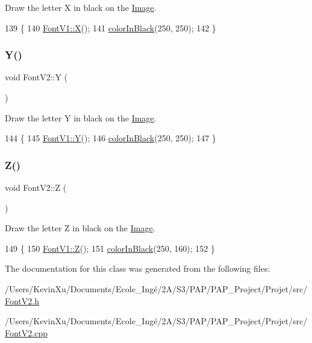Draw the letter X in black on the \mbox{\hyperlink{class_image}{Image}}. 


\begin{DoxyCode}
139                \{
140     \mbox{\hyperlink{class_font_v1_a8a93144edcf0f9bf1ac9017eb916ff82}{FontV1::X}}();
141     \mbox{\hyperlink{class_font_v2_a04f2501961bc286ce70fbb6a840b0e8a}{colorInBlack}}(250, 250);
142 \}
\end{DoxyCode}
\mbox{\label{class_font_v2_a858b25a33231fe1a78539d040e59f0ee}} 
\subsubsection{\texorpdfstring{Y()}{Y()}}
{\footnotesize\ttfamily void Font\+V2\+::Y (\begin{DoxyParamCaption}{ }\end{DoxyParamCaption})}



Draw the letter Y in black on the \mbox{\hyperlink{class_image}{Image}}. 


\begin{DoxyCode}
144                \{
145     \mbox{\hyperlink{class_font_v1_a25827e105e44581040d8c17cc821e4f3}{FontV1::Y}}();
146     \mbox{\hyperlink{class_font_v2_a04f2501961bc286ce70fbb6a840b0e8a}{colorInBlack}}(250, 250);
147 \}
\end{DoxyCode}
\mbox{\label{class_font_v2_a9650b871667f1c226d6e0e042f311a51}} 
\subsubsection{\texorpdfstring{Z()}{Z()}}
{\footnotesize\ttfamily void Font\+V2\+::Z (\begin{DoxyParamCaption}{ }\end{DoxyParamCaption})}



Draw the letter Z in black on the \mbox{\hyperlink{class_image}{Image}}. 


\begin{DoxyCode}
149                \{
150     \mbox{\hyperlink{class_font_v1_a10df574bc5aa14a43988d42db4e89504}{FontV1::Z}}();
151     \mbox{\hyperlink{class_font_v2_a04f2501961bc286ce70fbb6a840b0e8a}{colorInBlack}}(250, 160);
152 \}
\end{DoxyCode}


The documentation for this class was generated from the following files\+:\begin{DoxyCompactItemize}
\item 
/\+Users/\+Kevin\+Xu/\+Documents/\+Ecole\+\_\+\+Ingé/2\+A/\+S3/\+P\+A\+P/\+P\+A\+P\+\_\+\+Project/\+Projet/src/\mbox{\hyperlink{_font_v2_8h}{Font\+V2.\+h}}\item 
/\+Users/\+Kevin\+Xu/\+Documents/\+Ecole\+\_\+\+Ingé/2\+A/\+S3/\+P\+A\+P/\+P\+A\+P\+\_\+\+Project/\+Projet/src/\mbox{\hyperlink{_font_v2_8cpp}{Font\+V2.\+cpp}}\end{DoxyCompactItemize}
